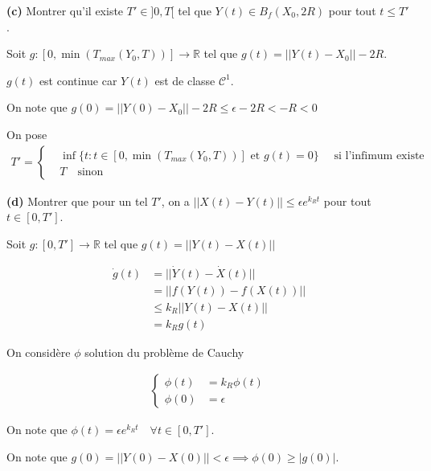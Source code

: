 \documentclass[french]{article}
\begin{document}
	\begin{tcolorbox}[colback=gray!5!white,colframe=gray!75!black]
		\textbf{\large{(c)}} Montrer qu'il existe $T' \in ]0, T[$ tel que $Y(t) \in B_f(X_0, 2R)$ pour tout $t \leq T'$.
	\end{tcolorbox}

	Soit $g: [0, \min(T_{max}(Y_0, T))] \to \mathbb{R}$ tel que  $g(t) = || Y(t) - X_0 || - 2R$.
	
	$g(t)$ est continue car $Y(t)$ est de classe $\mathcal{C}^1$.
	
	On note que $g(0) = ||Y(0) - X_0|| - 2R \leq \epsilon - 2R < -R < 0$
	
	On pose
	\begin{align}
	T' = 
		\begin{cases}
			&\inf \{ t : t \in [0, \min(T_{max}(Y_0, T))] \text{ et } g(t) = 0 \} \quad \text{ si l'infimum existe }\\
			&T \quad \text{sinon}
		\end{cases}
	\end{align}
	

	\begin{tcolorbox}[colback=gray!5!white,colframe=gray!75!black]
		\textbf{\large{(d)}} Montrer que pour un tel $T'$, on a $|| X(t) - Y(t) || \leq \epsilon e^{k_Rt}$ pour tout $t \in [0, T']$.
	\end{tcolorbox}

	Soit $g : [0, T'] \to \mathbb{R}$ tel que $g(t) = || Y(t) - X(t) ||$

	\begin{align}
		\dot{g}(t) &= || \dot{Y}(t) - \dot{X}(t) ||\\
						 &= || f(Y(t)) - f(X(t)) ||\\
						 &\leq k_R || Y(t) - X(t) ||\\
						 &= k_Rg(t)
	\end{align}
	
	On considère $\phi$ solution du problème de Cauchy
	
	\begin{align}
		\begin{cases}
		\phi(t) &= k_R\phi(t)\\
		\phi(0) &= \epsilon
		\end{cases}
	\end{align}
	
	On note que $\phi(t) = \epsilon e^{k_Rt} \quad \forall t \in [0, T']$.
	
	On note que $g(0) = ||Y(0) - X(0)|| < \epsilon \implies \phi(0) \geq |g(0)|$.
	
\end{document}
